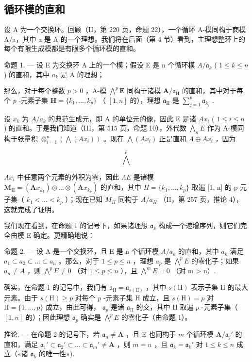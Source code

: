 \subsection{循环模的直和}

设 A 为一个交换环。回顾（II，第 220 页，命题 22），一个循环 A-模同构于商模 A/a，其中 a 是 A 的一个理想。我们将在后面（第 4 节）看到，主理想整环上的每个有限生成模都是有限多个循环模的直和。

命题 1. --- 设 E 为交换环 A 上的一个模；假设 E 是 n 个循环模 \(A/\mathfrak{a}_{k}\) ( \(1 \leqslant k \leqslant n\) ) 的直和，其中 \(a_{k}\) 是 A 的理想；

那么，对于每个整数 \(p > 0\) ，A-模 \(\bigwedge^p \mathbf{E}\) 同构于诸模 \(\mathbf{A} / \mathfrak{a}_{\mathrm{H}}\) 的直和，其中对于每个 \(p\) -元素子集 \(\mathbf{H} = \{k_1, \dots, k_p\}\) （ \([1, n]\) 的），理想 \(\mathfrak{a}_{\mathrm{H}}\) 是 \(\sum_{j=1}^{p} \mathfrak{a}_{k_j}\) .

设 \(x_{k}\) 为 \(A / a_{k}\) 的典范生成元，即 A 的单位元的像，因此 E 是诸 \(Ax_{i}\) ( \(1 \leqslant i \leqslant n\) ) 的直和。于是我们知道（III，第 515 页，命题 10），外代数 \(\bigwedge_{n} E\) 作为 A-模同构于张量积 \(\otimes_{i=1}^{n} (\bigwedge(Ax_{i}))\) 。现在 \(\bigwedge(Ax_{i})\) 正是直和 \(A \oplus Ax_{i}\) ，因为

\[
\bigwedge^ {p}
\]

\(Ax_{i}\) 中任意两个元素的外积为零，因此 \(\Lambda E\) 是诸模 \(\mathbf{M}_{\mathrm{H}} = (\mathbf{A}x_{k_{1}}) \otimes \ldots \otimes (\mathbf{A}x_{k_{p}})\) 的直和，其中 \(H = \{k_{1}, \ldots, k_{p}\}\) 取遍 {[}1, n{]} 的 p 元子集（ \(k_{1} < \ldots < k_{p}\) ）；现在已知 \(M_{H}\) 同构于 \(A/a_{H}\) （II，第 257 页，推论 4），这就完成了证明。

我们现在看到，在命题 1 的记号下，如果诸理想 \(\mathfrak{a}_k\) 构成一个递增序列，则它们完全由模 E 确定。更精确地说：

命题 2. --- 设 A 是一个交换环，且 E 是 n 个循环模 \(A/a_{k}\) 的直和，其中 \(a_{k}\) 满足 \(a_{1} \subset a_{2} \subset \ldots \subset a_{n}\) 。那么，对于 \(1 \leqslant p \leqslant n\) ，理想 \(a_{p}\) 是 \(\bigwedge^{p} E\) 的零化子；如果 \(a_{n} \neq A\) ，则 \(\bigwedge^{p} E \neq 0\) （对 \(1 \leqslant p \leqslant n\) ），且 \(\bigwedge^{m} E = 0\) （对 m \textgreater{} n）.

确实，在命题 1 的记号中，我们有 \(\mathfrak{a}_{\mathrm{H}} = \mathfrak{a}_{s(\mathrm{H})}\) ，其中 \(s(\mathrm{H})\) 表示子集 H 的最大元素。由于 \(s(\mathrm{H}) \geqslant p\) 对每个 \(p\) -元素子集 H 成立，且 \(s(\mathrm{H}) = p\) 对 \(\mathrm{H} = \{1, \dots, p\}\) 成立，由此可得， \(\mathfrak{a}_p\) 是诸 \(\mathfrak{a}_{\mathrm{H}}\) 的交，其中 H 取遍 \(p\) -元素子集（ \([1, n]\) 的）；因此理想 \(\mathfrak{a}_p\) 确实是 \(\bigwedge^p E\) 的零化子（由命题 1）。

推论. --- 在命题 2 的记号下，若 \(\mathfrak{a}_n \neq \mathbf{A}\) ，且 E 也同构于 \(m\) 个循环模 \(\mathbf{A} / \mathfrak{a}_j'\) 的直和，满足 \(\mathfrak{a}_1' \subset \mathfrak{a}_2' \subset \ldots \subset \mathfrak{a}_m' \neq \mathbf{A}\) ，则 \(m = n\) ，且 \(\mathfrak{a}_k = \mathfrak{a}_k'\) 对 \(1 \leqslant k \leqslant n\) 成立（«诸 \(\mathfrak{a}_k\) 的唯一性»).
\relax{}
